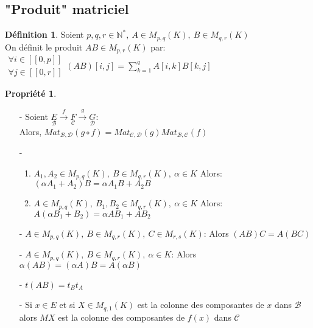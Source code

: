 \documentclass[fleqn]{article}
\theoremstyle{definition} \newtheorem*{defi}{D\'efinition}
\theoremstyle{definition} \newtheorem*{theo}{Th\'eor\`eme}
\theoremstyle{definition} \newtheorem*{coro}{Corollaire}
\theoremstyle{definition} \newtheorem*{nota}{Notation}
\theoremstyle{definition} \newtheorem*{vocab}{Vocabulaire}
\theoremstyle{remark} \newtheorem*{rqs}{Remarques}
\theoremstyle{definition} \newtheorem*{prop}{Propri\'et\'e}
\begin{document}
\subsection{"Produit" matriciel}
\begin{defi} Soient $p,q,r \in \mathbb{N}^*,\ A \in M_{p,q}(K),\ B \in M_{q,r}(K)$ \\
	On d\'efinit le produit $AB \in M_{p,r}(K)$ par: \\
	$\left. \begin{array}{l}
		\forall i \in [\![0,p]\!] \\
		\forall j \in [\![0,r]\!]
	\end{array}\right. (AB)[i,j] = \sum_{k=1}^q A[i,k]B[k,j]$

\end{defi}

\begin{prop} $ $
	\begin{enumerate}
		\item [-] Soient $\underset{\mathscr{B}}{E} \overset{f}{\rightarrow} \underset{\mathscr{C}}{F} \overset{g}{\rightarrow}
			\underset{\mathscr{D}}{G}$: \\
			Alors, $Mat_{\mathscr{B},\mathscr{D}}(g\circ f) = Mat_{\mathscr{C},\mathscr{D}}(g) Mat_{\mathscr{B},\mathscr{C}}(f)$
		\item [-]
			\begin{enumerate}
				\item $A_1, A_2 \in M_{p,q}(K),\ B \in M_{q,r}(K),\ \alpha \in K$ Alors:\\ $(\alpha A_1 + A_2)B = \alpha A_1 B + A_2 B$
				\item $A \in M_{p,q}(K),\ B_1, B_2 \in M_{q,r}(K),\ \alpha \in K$ Alors:\\ $A(\alpha B_1 + B_2) = \alpha A B_1 + A B_2$
			\end{enumerate}
		\item [-] $A \in M_{p,q}(K),\ B \in M_{q,r}(K),\ C \in M_{r,s}(K)$: Alors $(AB)C = A(BC)$
		\item [-] $A \in M_{p,q}(K),\ B \in M_{q,r}(K),\ \alpha \in K$: Alors $\alpha (AB) = (\alpha A)B = A (\alpha B)$
		\item [-] $t(AB) = t_B t_A$
		\item [-] Si $x \in E$ et si $X \in M_{q,1}(K)$ est la colonne des composantes de $x$ dans $\mathscr{B}$ alors $MX$ est la colonne des
			composantes de $f(x)$ dans $\mathscr{C}$
	\end{enumerate}
\end{prop}
\end{document}
